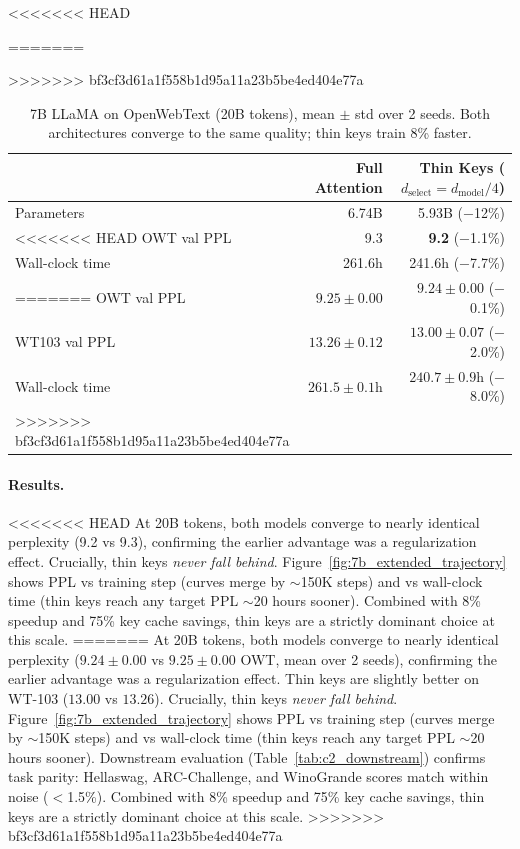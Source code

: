 \documentclass[11pt]{article}
\newcommand{\dmodel}{d_{\text{model}}}
\newcommand{\dselect}{d_{\text{select}}}
\begin{document}
\begin{table}[h]
\centering
<<<<<<< HEAD
\caption{7B LLaMA on OpenWebText (20B tokens). Both architectures converge to the same quality; thin keys train 8\% faster.}
=======
\caption{7B LLaMA on OpenWebText (20B tokens), mean $\pm$ std over 2 seeds. Both architectures converge to the same quality; thin keys train 8\% faster.}
>>>>>>> bf3cf3d61a1f558b1d95a11a23b5be4ed404e77a
\label{tab:7b_extended}
\begin{tabular}{lrr}
\toprule
 & Full Attention & Thin Keys ($\dselect = \dmodel/4$) \\
\midrule
Parameters & 6.74B & 5.93B ($-$12\%) \\
<<<<<<< HEAD
OWT val PPL & 9.3 & \textbf{9.2} ($-$1.1\%) \\
Wall-clock time & 261.6h & 241.6h ($-$7.7\%) \\
=======
OWT val PPL & $9.25 \pm 0.00$ & $\mathbf{9.24 \pm 0.00}$ ($-$0.1\%) \\
WT103 val PPL & $13.26 \pm 0.12$ & $\mathbf{13.00 \pm 0.07}$ ($-$2.0\%) \\
Wall-clock time & $261.5 \pm 0.1$h & $240.7 \pm 0.9$h ($-$8.0\%) \\
>>>>>>> bf3cf3d61a1f558b1d95a11a23b5be4ed404e77a
\bottomrule
\end{tabular}
\end{table}

\paragraph{Results.}
<<<<<<< HEAD
At 20B tokens, both models converge to nearly identical perplexity (9.2 vs 9.3), confirming the earlier advantage was a regularization effect. Crucially, thin keys \emph{never fall behind}. Figure~\ref{fig:7b_extended_trajectory} shows PPL vs training step (curves merge by $\sim$150K steps) and vs wall-clock time (thin keys reach any target PPL $\sim$20 hours sooner). Combined with 8\% speedup and 75\% key cache savings, thin keys are a strictly dominant choice at this scale.
=======
At 20B tokens, both models converge to nearly identical perplexity ($9.24 \pm 0.00$ vs $9.25 \pm 0.00$ OWT, mean over 2 seeds), confirming the earlier advantage was a regularization effect. Thin keys are slightly better on WT-103 ($13.00$ vs $13.26$). Crucially, thin keys \emph{never fall behind}. Figure~\ref{fig:7b_extended_trajectory} shows PPL vs training step (curves merge by $\sim$150K steps) and vs wall-clock time (thin keys reach any target PPL $\sim$20 hours sooner). Downstream evaluation (Table~\ref{tab:c2_downstream}) confirms task parity: Hellaswag, ARC-Challenge, and WinoGrande scores match within noise ($<$1.5\%). Combined with 8\% speedup and 75\% key cache savings, thin keys are a strictly dominant choice at this scale.
>>>>>>> bf3cf3d61a1f558b1d95a11a23b5be4ed404e77a
\end{document}
